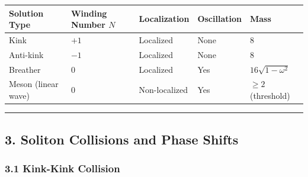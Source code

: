\documentclass[a4paper,11pt]{article}
\newcounter{none}
\begin{document}
{\def\LTcaptype{none} %
\begin{longtable}[]{@{}
  >{\centering\arraybackslash}p{}
  >{\centering\arraybackslash}p{}
  >{\centering\arraybackslash}p{}
  >{\centering\arraybackslash}p{}
  >{\centering\arraybackslash}p{}@{}}
\toprule\noalign{}
\begin{minipage}[b]{\linewidth}\centering
Solution Type
\end{minipage} & \begin{minipage}[b]{\linewidth}\centering
Winding Number \(N\)
\end{minipage} & \begin{minipage}[b]{\linewidth}\centering
Localization
\end{minipage} & \begin{minipage}[b]{\linewidth}\centering
Oscillation
\end{minipage} & \begin{minipage}[b]{\linewidth}\centering
Mass
\end{minipage} \\
\midrule\noalign{}
\endhead
\bottomrule\noalign{}
\endlastfoot
Kink & \(+1\) & Localized & None & \(8\) \\
Anti-kink & \(-1\) & Localized & None & \(8\) \\
Breather & \(0\) & Localized & Yes & \(16\sqrt{1-\omega^2}\) \\
Meson (linear wave) & \(0\) & Non-localized & Yes & \(\geq 2\)
(threshold) \\
\end{longtable}
}

\begin{center}\rule{0.5\linewidth}{0.5pt}\end{center}

\subsection{3. Soliton Collisions and Phase
Shifts}\label{soliton-collisions-and-phase-shifts}

\subsubsection{3.1 Kink-Kink Collision}\label{kink-kink-collision}
\end{document}
